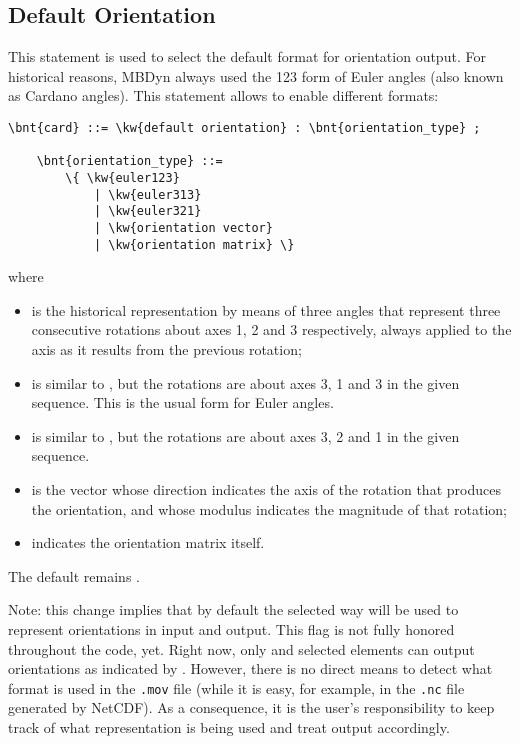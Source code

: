 \subsection{Default Orientation}\label{sec:CONTROLDATA:DEFAULTORIENTATION}
This statement is used to select the default format for orientation output.
For historical reasons, MBDyn always used the 123 form of Euler angles
(also known as Cardano angles).
This statement allows to enable different formats:
\begin{Verbatim}[commandchars=\\\{\}]
    \bnt{card} ::= \kw{default orientation} : \bnt{orientation_type} ;

    \bnt{orientation_type} ::=
        \{ \kw{euler123}
            | \kw{euler313}
            | \kw{euler321}
            | \kw{orientation vector}
            | \kw{orientation matrix} \}
\end{Verbatim}
where
\begin{itemize}
\item {} is the historical representation by means 
	of three angles that represent three consecutive rotations
	about axes 1, 2 and 3 respectively, always applied to the axis
	as it results from the previous rotation;
\item {} is similar to , but the rotations
are about axes 3, 1 and 3 in the given sequence.
This is the usual form for Euler angles.
\item {} is similar to , but the rotations
are about axes 3, 2 and 1 in the given sequence.
\item {} is the vector whose direction indicates
	the axis of the rotation that produces the orientation,
	and whose modulus indicates the magnitude of that rotation;
\item {} indicates the orientation matrix itself.
\end{itemize}
The default remains .

Note: this change implies that by default the selected way will be used
to represent orientations in input and output.
This flag is not fully honored throughout the code, yet.
Right now, only  and selected elements
can output orientations as indicated by .
However, there is no direct means to detect what format is used
in the \texttt{.mov} file (while it is easy, for example, in the \texttt{.nc}
file generated by NetCDF).
As a consequence, it is the user's responsibility to keep track
of what representation is being used and treat output accordingly.

